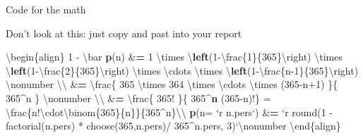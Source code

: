 \documentclass[ignorenonframetext,]{beamer}
\newenvironment{Shaded}{\begin{snugshade}}{\end{snugshade}}
\newcommand{\KeywordTok}[1]{\textcolor[rgb]{0.13,0.29,0.53}{\textbf{{#1}}}}
\newcommand{\DataTypeTok}[1]{\textcolor[rgb]{0.13,0.29,0.53}{{#1}}}
\newcommand{\DecValTok}[1]{\textcolor[rgb]{0.00,0.00,0.81}{{#1}}}
\newcommand{\StringTok}[1]{\textcolor[rgb]{0.31,0.60,0.02}{{#1}}}
\newcommand{\ErrorTok}[1]{\textcolor[rgb]{0.64,0.00,0.00}{\textbf{{#1}}}}
\newcommand{\NormalTok}[1]{{#1}}
\begin{document}
\begin{frame}[fragile]{Code for the math}

Don't look at this: just copy and past into your report

\begin{Shaded}
\begin{Highlighting}[]
\NormalTok{\textbackslash{}begin\{align\} }
 \DecValTok{1} \NormalTok{-}\StringTok{ }\NormalTok{\textbackslash{}bar }\KeywordTok{p}\NormalTok{(n) &}\ErrorTok{=}\StringTok{ }\DecValTok{1} \NormalTok{\textbackslash{}times \textbackslash{}}\KeywordTok{left}\NormalTok{(}\DecValTok{1}\NormalTok{-\textbackslash{}frac\{}\DecValTok{1}\NormalTok{\}\{}\DecValTok{365}\NormalTok{\}\textbackslash{}right) }
 \NormalTok{\textbackslash{}times \textbackslash{}}\KeywordTok{left}\NormalTok{(}\DecValTok{1}\NormalTok{-\textbackslash{}frac\{}\DecValTok{2}\NormalTok{\}\{}\DecValTok{365}\NormalTok{\}\textbackslash{}right) \textbackslash{}times \textbackslash{}cdots \textbackslash{}times }
 \NormalTok{\textbackslash{}}\KeywordTok{left}\NormalTok{(}\DecValTok{1}\NormalTok{-\textbackslash{}frac\{n}\DecValTok{-1}\NormalTok{\}\{}\DecValTok{365}\NormalTok{\}\textbackslash{}right) \textbackslash{}nonumber  \textbackslash{}\textbackslash{}  }
 \NormalTok{&}\ErrorTok{=}\StringTok{ }\NormalTok{\textbackslash{}frac\{ }\DecValTok{365} \NormalTok{\textbackslash{}times }\DecValTok{364} \NormalTok{\textbackslash{}times \textbackslash{}cdots \textbackslash{}times }
   \NormalTok{(}\DecValTok{365}\NormalTok{-n}\DecValTok{+1}\NormalTok{) \}\{ }\DecValTok{365}\NormalTok{^n \} \textbackslash{}nonumber \textbackslash{}\textbackslash{} }
 \NormalTok{&}\ErrorTok{=}\StringTok{ }\NormalTok{\textbackslash{}frac\{ }\DecValTok{365}\NormalTok{!}\StringTok{ }\NormalTok{\}\{ }\DecValTok{365}\NormalTok{^}\KeywordTok{n} \NormalTok{(}\DecValTok{365}\NormalTok{-n)!\} =}\StringTok{ }
\StringTok{   }\NormalTok{\textbackslash{}frac\{n!\textbackslash{}cdot\textbackslash{}binom\{}\DecValTok{365}\NormalTok{\}\{n\}\}\{}\DecValTok{365}\NormalTok{^n\}\textbackslash{}\textbackslash{}}
\KeywordTok{p}\NormalTok{(}\DataTypeTok{n=} \StringTok{`}\DataTypeTok{r n.pers}\StringTok{`}\NormalTok{) &}\ErrorTok{=}\StringTok{ `}\DataTypeTok{r  }
\DataTypeTok{ round(1 - factorial(n.pers) * }
\DataTypeTok{         choose(365,n.pers)/ 365^n.pers, 3)}\StringTok{`}\NormalTok{\textbackslash{}nonumber}
\NormalTok{\textbackslash{}end\{align\}}
\end{Highlighting}
\end{Shaded}

\end{frame}
\end{document}
